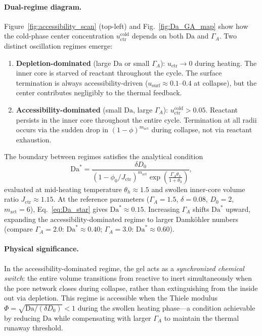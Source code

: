 \documentclass[aps,pre,reprint,superscriptaddress,longbibliography,floatfix]{revtex4-2}
\newcommand{\Da}{\mathrm{Da}}
\begin{document}
\paragraph{Dual-regime diagram.}
Figure~\ref{fig:accessibility_scan} (top-left) and
Fig.~\ref{fig:Da_GA_map} show how the cold-phase center concentration
$u_\mathrm{ctr}^\mathrm{cold}$ depends on both $\Da$ and $\Gamma_A$.
Two distinct oscillation regimes emerge:

\begin{enumerate}
  \item \textbf{Depletion-dominated} (large $\Da$ or small $\Gamma_A$):
    $u_\mathrm{ctr}\to 0$ during heating. The inner core is starved of
    reactant throughout the cycle. The surface termination is always
    accessibility-driven ($u_\mathrm{surf}\approx 0.1$--$0.4$ at collapse),
    but the center contributes negligibly to the thermal feedback.

  \item \textbf{Accessibility-dominated} (small $\Da$, large $\Gamma_A$):
    $u_\mathrm{ctr}^\mathrm{cold}>0.05$. Reactant persists in the inner
    core throughout the entire cycle. Termination at all radii occurs
    via the sudden drop in $(1-\phi)^{m_\mathrm{act}}$ during collapse,
    not via reactant exhaustion.
\end{enumerate}

The boundary between regimes satisfies the analytical condition
\begin{equation}
  \Da^* = \frac{\delta D_0}{\left(1-\phi_0/J_\mathrm{ctr}
  \right)^{m_\mathrm{act}} \exp\!\left(\frac{\Gamma_A\theta_h}{1+\theta_h}
  \right)},
  \label{eq:Da_star}
\end{equation}
evaluated at mid-heating temperature $\theta_h\approx 1.5$ and swollen
inner-core volume ratio $J_\mathrm{ctr}\approx 1.15$.
At the reference parameters ($\Gamma_A=1.5$, $\delta=0.08$, $D_0=2$,
$m_\mathrm{act}=6$), Eq.~\eqref{eq:Da_star} gives $\Da^*\approx 0.15$.
Increasing $\Gamma_A$ shifts $\Da^*$ upward, expanding the
accessibility-dominated regime to larger Damk\"ohler numbers (compare
$\Gamma_A=2.0$: $\Da^*\approx 0.40$; $\Gamma_A=3.0$: $\Da^*\approx 0.60$).

\paragraph{Physical significance.}
In the accessibility-dominated regime, the gel acts as a
\emph{synchronized chemical switch}: the entire volume transitions from
reactive to inert simultaneously when the pore network closes during
collapse, rather than extinguishing from the inside out via depletion.
This regime is accessible when the Thiele modulus $\Phi=\sqrt{\Da/(\delta
D_0)}<1$ during the swollen heating phase—a condition achievable by
reducing $\Da$ while compensating with larger $\Gamma_A$ to maintain
the thermal runaway threshold.
\end{document}

